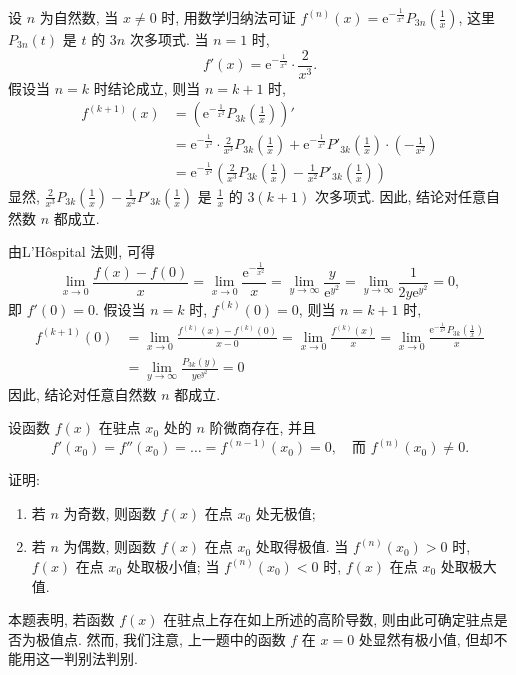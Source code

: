 \begin{solution}
    设 $n$ 为自然数, 当 $x \ne 0$ 时, 用数学归纳法可证 $f^{(n)}(x) = \mathrm{e}^{-\frac{1}{x^2}} P_{3n}\left(\frac{1}{x}\right)$, 这里 $P_{3n}(t)$ 是 $t$ 的 $3n$ 次多项式. 当 $n=1$ 时,
    $$f'(x) = \mathrm{e}^{-\frac{1}{x^2}} \cdot \frac{2}{x^3}.$$
    假设当 $n=k$ 时结论成立, 则当 $n=k+1$ 时,
    \begin{align*}
        f^{(k+1)}(x) & = \left(\mathrm{e}^{-\frac{1}{x^2}} P_{3k}\left(\frac{1}{x}\right)\right)'                                                                                                       \\
                     & = \mathrm{e}^{-\frac{1}{x^2}} \cdot \frac{2}{x^3} P_{3k}\left(\frac{1}{x}\right) + \mathrm{e}^{-\frac{1}{x^2}} P'_{3k}\left(\frac{1}{x}\right) \cdot \left(-\frac{1}{x^2}\right) \\
                     & = \mathrm{e}^{-\frac{1}{x^2}} \left(\frac{2}{x^3} P_{3k}\left(\frac{1}{x}\right) - \frac{1}{x^2} P'_{3k}\left(\frac{1}{x}\right)\right)
    \end{align*}
    显然, $\frac{2}{x^3} P_{3k}\left(\frac{1}{x}\right) - \frac{1}{x^2} P'_{3k}\left(\frac{1}{x}\right)$ 是 $\frac{1}{x}$ 的 $3(k+1)$ 次多项式. 因此, 结论对任意自然数 $n$ 都成立.

    由L'Hôspital 法则, 可得
    $$\lim_{x \to 0} \frac{f(x) - f(0)}{x} = \lim_{x \to 0} \frac{\mathrm{e}^{-\frac{1}{x^2}}}{x} = \lim_{y \to \infty} \frac{y}{\mathrm{e}^{y^2}} = \lim_{y \to \infty} \frac{1}{2y \mathrm{e}^{y^2}} = 0,$$
    即 $f'(0) = 0$.
    假设当 $n=k$ 时, $f^{(k)}(0) = 0$, 则当 $n=k+1$ 时,
    \begin{align*}
        f^{(k+1)}(0) & = \lim_{x \to 0} \frac{f^{(k)}(x) - f^{(k)}(0)}{x - 0} = \lim_{x \to 0} \frac{f^{(k)}(x)}{x} = \lim_{x \to 0} \frac{\mathrm{e}^{-\frac{1}{x^2}} P_{3k}\left(\frac{1}{x}\right)}{x} \\
                     & = \lim_{y \to \infty} \frac{P_{3k}(y)}{y \mathrm{e}^{y^2}} = 0
    \end{align*}
    因此, 结论对任意自然数 $n$ 都成立.
\end{solution}

\begin{exercise}[3.6.11]
    设函数 $f(x)$ 在驻点 $x_0$ 处的 $n$ 阶微商存在, 并且
    $$f'(x_0) = f''(x_0) = \dots = f^{(n-1)}(x_0) = 0, \quad \text{而 } f^{(n)}(x_0) \ne 0.$$

    证明:
    \begin{enumerate}
        \item 若 $n$ 为奇数, 则函数 $f(x)$ 在点 $x_0$ 处无极值;
        \item 若 $n$ 为偶数, 则函数 $f(x)$ 在点 $x_0$ 处取得极值. 当 $f^{(n)}(x_0) > 0$ 时, $f(x)$ 在点 $x_0$ 处取极小值; 当 $f^{(n)}(x_0) < 0$ 时, $f(x)$ 在点 $x_0$ 处取极大值.
    \end{enumerate}
    本题表明, 若函数 $f(x)$ 在驻点上存在如上所述的高阶导数, 则由此可确定驻点是否为极值点. 然而, 我们注意, 上一题中的函数 $f$ 在 $x=0$ 处显然有极小值, 但却不能用这一判别法判别.
\end{exercise}

